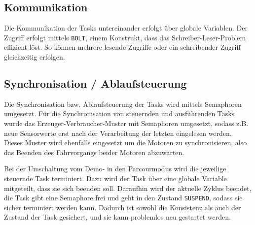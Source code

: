 \subsection{Kommunikation}
Die Kommunikation der Tasks untereinander erfolgt über globale Variablen. Der Zugriff erfolgt mittels \texttt{BOLT}, einem Konstrukt, dass das Schreiber-Leser-Problem effizient löst. So können mehrere lesende Zugriffe oder ein schreibender Zugriff gleichzeitig erfolgen.

\subsection{Synchronisation / Ablaufsteuerung}
Die Synchronisation bzw. Ablaufsteuerung der Tasks wird mittels Semaphoren umgesetzt. Für die Synchronisation von steuernden und ausführenden Tasks wurde das Erzeuger-Verbraucher-Muster mit Semaphoren umgesetzt, sodass z.B. neue Sensorwerte erst nach der Verarbeitung der letzten eingelesen werden. Dieses Muster wird ebenfalls eingesetzt um die Motoren zu synchronisieren, also das Beenden des Fahrvorgangs beider Motoren abzuwarten.

Bei der Umschaltung vom Demo- in den Parcourmodus wird die jeweilige steuernde Task terminiert. Dazu wird der Task über eine globale Variable mitgeteilt, dass sie sich beenden soll. Daraufhin wird der aktuelle Zyklus beendet, die Task gibt eine Semaphore frei und geht in den Zustand \texttt{SUSPEND}, sodass sie sicher terminiert werden kann. Dadurch ist sowohl die Konsistenz als auch der Zustand der Task gesichert, und sie kann problemlos neu gestartet werden.

